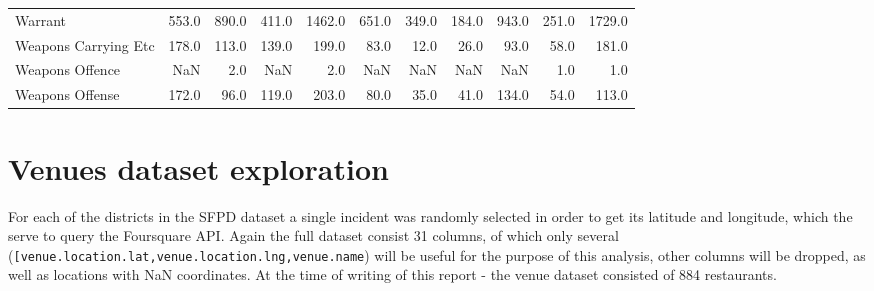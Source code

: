 \documentclass[10pt,parskip=half,
toc=sectionentrywithdots,
bibliography=totocnumbered,
captions=tableheading,numbers=noendperiod]{scrartcl}
\begin{document}
\begin{table}[H]
\begin{adjustbox}{max width=\textwidth}
{\begin{tabular}{lrrrrrrrrrr}
Warrant                                    &    553.0 &    890.0 &      411.0 &   1462.0 &     651.0 &   349.0 &     184.0 &     943.0 &    251.0 &      1729.0 \\
Weapons Carrying Etc                       &    178.0 &    113.0 &      139.0 &    199.0 &      83.0 &    12.0 &      26.0 &      93.0 &     58.0 &       181.0 \\
Weapons Offence                            &      NaN &      2.0 &        NaN &      2.0 &       NaN &     NaN &       NaN &       NaN &      1.0 &         1.0 \\
Weapons Offense                            &    172.0 &     96.0 &      119.0 &    203.0 &      80.0 &    35.0 &      41.0 &     134.0 &     54.0 &       113.0 \\
\bottomrule
\end{tabular}
}
\end{adjustbox}
\end{table}

\hypertarget{venues-dataset-exploration}{%
\section{Venues dataset exploration}\label{venues-dataset-exploration}}

For each of the districts in the SFPD dataset a single incident was
randomly selected in order to get its latitude and longitude, which the
serve to query the Foursquare API. Again the full dataset consist 31
columns, of which only several
(\texttt{{[}\textquotesingle{}venue.location.lat\textquotesingle{},\textquotesingle{}venue.location.lng\textquotesingle{},\textquotesingle{}venue.name\textquotesingle{}{]}})
will be useful for the purpose of this analysis, other columns will be
dropped, as well as locations with NaN coordinates. At the time of
writing of this report - the venue dataset consisted of 884 restaurants.
\end{document}
